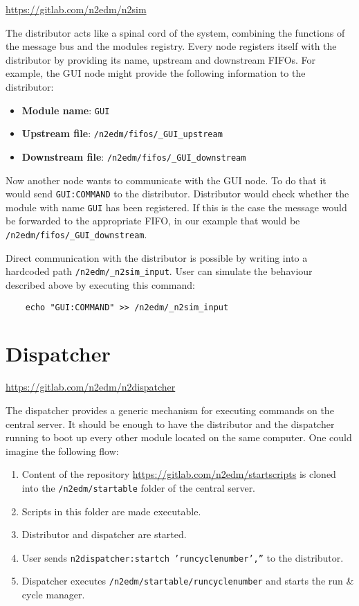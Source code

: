 \url{https://gitlab.com/n2edm/n2sim}

The distributor acts like a spinal cord of the system, combining the functions of the message bus and the modules registry. Every node registers itself with the distributor by providing its name, upstream and downstream FIFOs. For example, the GUI node might provide the following information to the distributor:

\begin{itemize}
	\item \textbf{Module name}: \texttt{GUI}
	\item \textbf{Upstream file}: \texttt{/n2edm/fifos/\_GUI\_upstream}
	\item \textbf{Downstream file}: \texttt{/n2edm/fifos/\_GUI\_downstream}
\end{itemize}

Now another node wants to communicate with the GUI node. To do that it would send \texttt{GUI:COMMAND} to the distributor. Distributor would check whether the module with name \texttt{GUI} has been registered. If this is the case the message would be forwarded to the appropriate FIFO, in our example that would be \texttt{/n2edm/fifos/\_GUI\_downstream}.

Direct communication with the distributor is possible by writing into a hardcoded path \texttt{/n2edm/\_n2sim\_input}. User can simulate the behaviour described above by executing this command:
\begin{verbatim}
	echo "GUI:COMMAND" >> /n2edm/_n2sim_input
\end{verbatim}

\section{Dispatcher}
\label{sec:dispatcher}

\url{https://gitlab.com/n2edm/n2dispatcher}

The dispatcher provides a generic mechanism for executing commands on the central server. It should be enough to have the distributor and the dispatcher running to boot up every other module located on the same computer. One could imagine the following flow:
\begin{enumerate}
	\item Content of the repository \url{https://gitlab.com/n2edm/startscripts} is cloned into the \texttt{/n2edm/startable} folder of the central server.
	\item Scripts in this folder are made executable.
	\item Distributor and dispatcher are started.
	\item User sends \texttt{n2dispatcher:startch 'runcyclenumber',''} to the distributor.
	\item Dispatcher executes \texttt{/n2edm/startable/runcyclenumber} and starts the run \& cycle manager.
\end{enumerate}


